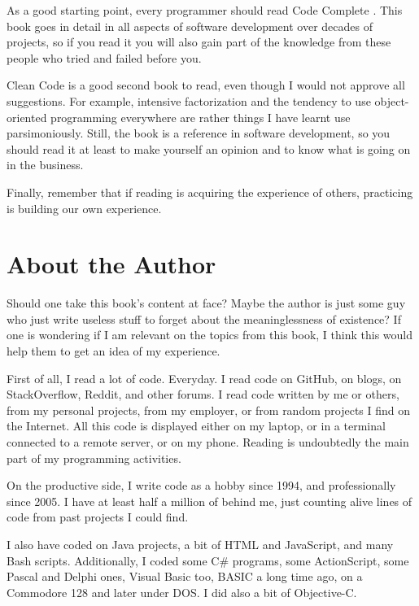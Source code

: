 As a good starting point, every programmer should read Code Complete
\cite{code-complete}. This book goes in detail in all aspects of
software development over decades of projects, so if you read it you
will also gain part of the knowledge from these people who tried and
failed before you.

Clean Code \cite{clean-code} is a good second book to read, even
though I would not approve all suggestions. For example, intensive
factorization and the tendency to use object-oriented programming
everywhere are rather things I have learnt use parsimoniously. Still,
the book is a reference in software development, so you should read it
at least to make yourself an opinion and to know what is going on in
the business.

\bigskip

Finally, remember that if reading is acquiring the experience of
others, practicing is building our own experience.

\section{About the Author}

Should one take this book's content at face? Maybe the author is just
some guy who just write useless stuff to forget about the
meaninglessness of existence? If one is wondering if I am relevant on
the topics from this book, I think this would help them to get an idea
of my experience.

\bigskip

First of all, I read a lot of code. Everyday. I read code on GitHub,
on blogs, on StackOverflow, Reddit, and other forums. I read code
written by me or others, from my personal projects, from my employer,
or from random projects I find on the Internet. All this code is
displayed either on my laptop, or in a terminal connected to a remote
server, or on my phone. Reading is undoubtedly the main part of my
programming activities.

On the productive side, I write code as a hobby since 1994, and
professionally since 2005. I have at least half a million of \cpp{}
behind me, just counting alive lines of code from past projects I
could find.

I also have coded on Java projects, a bit of HTML and JavaScript, and
many Bash scripts. Additionally, I coded some C\# programs, some
ActionScript, some Pascal and Delphi ones, Visual Basic too, BASIC a
long time ago, on a Commodore 128 and later under DOS. I did also a
bit of Objective-C.

